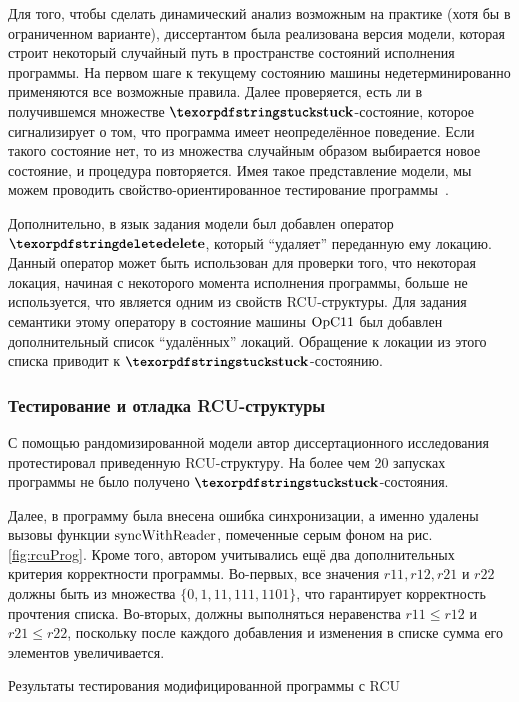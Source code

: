 Для того, чтобы сделать динамический анализ возможным на практике (хотя бы в ограниченном варианте),
диссертантом была реализована версия модели, которая строит некоторый случайный путь в пространстве состояний исполнения программы.
На первом шаге к текущему состоянию машины недетерминированно применяются все возможные правила.
Далее проверяется, есть ли в получившемся множестве $\kw{stuck}$-состояние, которое сигнализирует о том, что
программа имеет неопределённое поведение. Если такого состояние нет, то из множества случайным образом выбирается
новое состояние, и процедура повторяется.
Имея такое представление модели, мы можем проводить свойство-ориентированное тестирование программы~\cite{Hritcu-al:ICFP13}.

Дополнительно, в язык задания модели был добавлен оператор $\kw{delete}$, который ``удаляет'' переданную ему локацию.
Данный оператор может быть использован для проверки того, что некоторая локация, начиная с некоторого момента исполнения программы,
больше не используется, что является одним из свойств RCU-структуры.
Для задания семантики этому оператору в состояние машины $\mathrm{OpC11}$ был добавлен дополнительный список ``удалённых'' локаций.
Обращение к локации из этого списка приводит к $\kw{stuck}$-состоянию.

\subsubsection{Тестирование и отладка RCU-структуры}
С помощью рандомизированной модели автор диссертационного исследования протестировал приведенную RCU-структуру.
На более чем 20 запусках программы не было получено $\kw{stuck}$-состояния.

Далее, в программу была внесена ошибка синхронизации, а именно удалены вызовы функции ${\rm syncWithReader}$,
помеченные серым фоном на рис. \ref{fig:rcuProg}.
Кроме того, автором учитывались ещё два дополнительных критерия корректности программы.
Во-первых, все значения $r11, r12, r21$ и $r22$ должны быть из множества $\{0, 1, 11, 111, 1101\}$,
что гарантирует корректность прочтения списка.
Во-вторых, должны выполняться неравенства $r11 \le r12$ и $r21 \le r22$, поскольку после каждого добавления и
изменения в списке сумма его элементов увеличивается.

\begin{table}
\centering
  
\caption{Результаты тестирования модифицированной программы с RCU}
\label{fig:tblRun}
\end{table}

